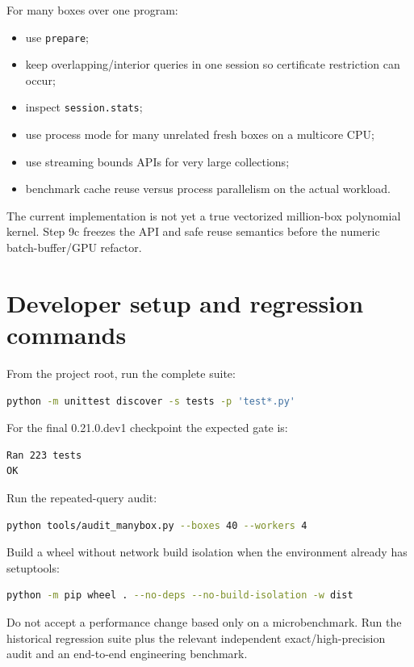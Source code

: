 \documentclass[11pt]{article}
\begin{document}
For many boxes over one program:
\begin{itemize}[leftmargin=*]
\item use \texttt{prepare};
\item keep overlapping/interior queries in one session so certificate restriction
can occur;
\item inspect \texttt{session.stats};
\item use process mode for many unrelated fresh boxes on a multicore CPU;
\item use streaming bounds APIs for very large collections;
\item benchmark cache reuse versus process parallelism on the actual workload.
\end{itemize}

The current implementation is not yet a true vectorized million-box polynomial
kernel.  Step 9c freezes the API and safe reuse semantics before the numeric
batch-buffer/GPU refactor.

\section{Developer setup and regression commands}

From the project root, run the complete suite:
\begin{lstlisting}[language=bash]
python -m unittest discover -s tests -p 'test*.py'
\end{lstlisting}

For the final 0.21.0.dev1 checkpoint the expected gate is:
\begin{lstlisting}
Ran 223 tests
OK
\end{lstlisting}

Run the repeated-query audit:
\begin{lstlisting}[language=bash]
python tools/audit_manybox.py --boxes 40 --workers 4
\end{lstlisting}

Build a wheel without network build isolation when the environment already has
setuptools:
\begin{lstlisting}[language=bash]
python -m pip wheel . --no-deps --no-build-isolation -w dist
\end{lstlisting}

Do not accept a performance change based only on a microbenchmark.  Run the
historical regression suite plus the relevant independent exact/high-precision
audit and an end-to-end engineering benchmark.
\end{document}
